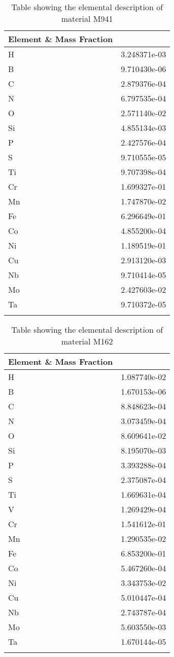 \begin{centering}
\begin{longtable}[ht!]
{ p{} | p{} }
\hline
Element \& Mass Fraction\\
\hline
H &  3.248371e-03\\
B &  9.710430e-06\\
C &  2.879376e-04\\
N &  6.797535e-04\\
O &  2.571140e-02\\
Si &  4.855134e-03\\
P &  2.427576e-04\\
S &  9.710555e-05\\
Ti &  9.707398e-04\\
Cr &  1.699327e-01\\
Mn &  1.747870e-02\\
Fe &  6.296649e-01\\
Co &  4.855200e-04\\
Ni &  1.189519e-01\\
Cu &  2.913120e-03\\
Nb &  9.710414e-05\\
Mo &  2.427603e-02\\
Ta &  9.710372e-05\\

\caption{Table showing the elemental description of material M941}
\label{table:material_EPP2L}
\end{longtable}
\clearpage

\begin{longtable}[ht!]
{ p{} | p{} }
\hline
Element \& Mass Fraction\\
\hline
H &  1.087740e-02\\
B &  1.670153e-06\\
C &  8.848623e-04\\
N &  3.073459e-04\\
O &  8.609641e-02\\
Si &  8.195070e-03\\
P &  3.393288e-04\\
S &  2.375087e-04\\
Ti &  1.669631e-04\\
V &  1.269429e-04\\
Cr &  1.541612e-01\\
Mn &  1.290535e-02\\
Fe &  6.853200e-01\\
Co &  5.467260e-04\\
Ni &  3.343753e-02\\
Cu &  5.010447e-04\\
Nb &  2.743787e-04\\
Mo &  5.603550e-03\\
Ta &  1.670144e-05\\
\caption{Table showing the elemental description of material M162}
\label{table:material_M162}
\end{longtable}            
\clearpage

\end{centering}
